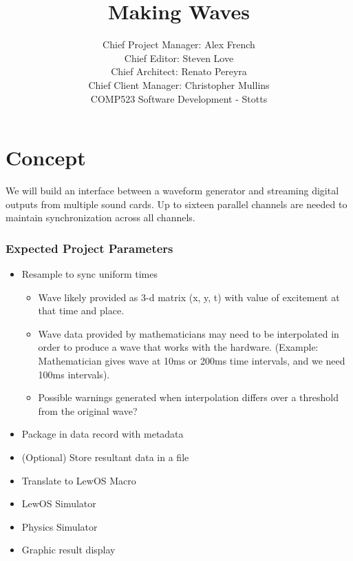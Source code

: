 \documentclass[12pt]{article}
\begin{document}

\title{Making Waves}%
\author{Chief Project Manager: Alex French \\ 
Chief Editor: Steven Love\\
Chief Architect: Renato Pereyra\\
Chief Client Manager: Christopher Mullins\\ %
COMP523 Software Development - Stotts} %

\maketitle

\section{Concept}

We will build an interface between a waveform generator and streaming digital outputs from multiple sound cards. Up to sixteen parallel channels are needed to maintain synchronization across all channels.

\subsubsection{Expected Project Parameters}
\begin{itemize}
\item Resample to sync uniform times
\begin{itemize}
	\item Wave likely provided as 3-d matrix (x, y, t) with value of excitement at that time and place.
	\item Wave data provided by mathematicians may need to be interpolated in order to produce a wave that works with the hardware. (Example: Mathematician gives wave at 10ms or 200ms time intervals, and we need 100ms intervals).
	\item Possible warnings generated when interpolation differs over a threshold from the original wave?

\end{itemize}
\item Package in data record with metadata
\item (Optional) Store resultant data in a file
\item Translate to LewOS Macro
\item LewOS Simulator
\item Physics Simulator
\item Graphic result display
\end{itemize}
\end{document}
